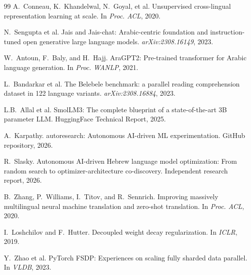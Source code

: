 \documentclass[11pt,a4paper]{article}
\begin{document}
\begin{thebibliography}{99}
A.~Conneau, K.~Khandelwal, N.~Goyal, et al.
\newblock Unsupervised cross-lingual representation learning at scale.
\newblock In \emph{Proc. ACL}, 2020.

N.~Sengupta et al.
\newblock Jais and Jais-chat: Arabic-centric foundation and instruction-tuned open generative large language models.
\newblock \emph{arXiv:2308.16149}, 2023.

W.~Antoun, F.~Baly, and H.~Hajj.
\newblock AraGPT2: Pre-trained transformer for Arabic language generation.
\newblock In \emph{Proc. WANLP}, 2021.

L.~Bandarkar et al.
\newblock The Belebele benchmark: a parallel reading comprehension dataset in 122 language variants.
\newblock \emph{arXiv:2308.16884}, 2023.

L.B.~Allal et al.
\newblock SmolLM3: The complete blueprint of a state-of-the-art 3B parameter LLM.
\newblock HuggingFace Technical Report, 2025.

A.~Karpathy.
\newblock autoresearch: Autonomous AI-driven ML experimentation.
\newblock GitHub repository, 2026.

R.~Slasky.
\newblock Autonomous AI-driven Hebrew language model optimization: From random search to optimizer-architecture co-discovery.
\newblock Independent research report, 2026.

B.~Zhang, P.~Williams, I.~Titov, and R.~Sennrich.
\newblock Improving massively multilingual neural machine translation and zero-shot translation.
\newblock In \emph{Proc. ACL}, 2020.

I.~Loshchilov and F.~Hutter.
\newblock Decoupled weight decay regularization.
\newblock In \emph{ICLR}, 2019.

Y.~Zhao et al.
\newblock PyTorch FSDP: Experiences on scaling fully sharded data parallel.
\newblock In \emph{VLDB}, 2023.

\end{thebibliography}
\end{document}
